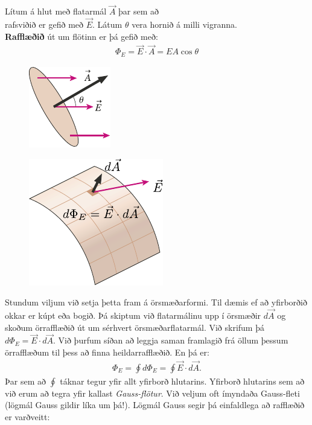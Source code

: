 \begin{tcolorbox}
\begin{definition}
Lítum á hlut með flatarmál $\vec{A}$ þar sem að \\ rafsviðið er gefið með $\vec{E}$. Látum $\theta$ vera hornið á milli vigranna. \\ \textbf{Rafflæðið} út um flötinn er þá gefið með:
\begin{align*}
    \Phi_E = \vec{E} \cdot \vec{A} = EA\cos\theta
\end{align*}
\end{definition}
\vspace{-2.75cm}
\begin{figure}[H]
    \hspace{11cm}
    \includegraphics{figures/rafflaedinn.pdf}
\end{figure}
\end{tcolorbox}

\vspace{0.2cm}

\begin{minipage}{\linewidth}

\begin{figure}
\vspace{0.4cm}
\centering
\includegraphics{figures/orsmaedarflaedi.pdf}
\end{figure}


Stundum viljum við setja þetta fram á örsmæðarformi. Til dæmis ef að yfirborðið okkar er kúpt eða bogið. Þá skiptum við flatarmálinu upp í örsmæðir $d\vec{A}$ og skoðum örrafflæðið út um sérhvert örsmæðarflatarmál. Við skrifum þá $d\Phi_E = \vec{E} \cdot d\vec{A}$. Við þurfum síðan að leggja saman framlagið frá öllum þessum örrafflæðum til þess að finna heildarrafflæðið. En þá er:
\begin{align*}
    \Phi_E = \oint d \Phi_E = \oint \vec{E} \cdot d\vec{A}.
\end{align*}
Þar sem að $\oint$ táknar tegur yfir allt yfirborð hlutarins. Yfirborð hlutarins sem að við erum að tegra yfir kallast \emph{Gauss-flötur}. Við veljum oft ímyndaða Gauss-fleti (lögmál Gauss gildir líka um þá!). Lögmál Gauss segir þá einfaldlega að rafflæðið er varðveitt:
\end{minipage}

